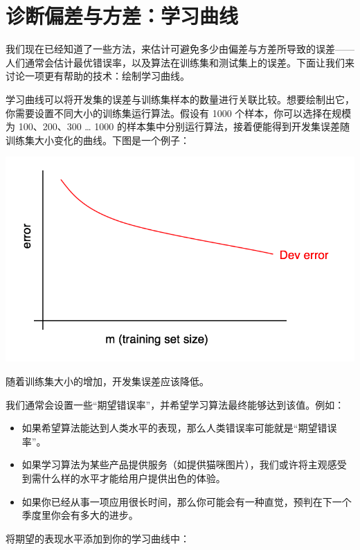 \hypertarget{ux8bcaux65adux504fux5deeux4e0eux65b9ux5deeux5b66ux4e60ux66f2ux7ebf}{%
\chapter{诊断偏差与方差：学习曲线}\label{ux8bcaux65adux504fux5deeux4e0eux65b9ux5deeux5b66ux4e60ux66f2ux7ebf}}

我们现在已经知道了一些方法，来估计可避免多少由偏差与方差所导致的误差------人们通常会估计最优错误率，以及算法在训练集和测试集上的误差。下面让我们来讨论一项更有帮助的技术：绘制学习曲线。

学习曲线可以将开发集的误差与训练集样本的数量进行关联比较。想要绘制出它，你需要设置不同大小的训练集运行算法。假设有
1000 个样本，你可以选择在规模为 100、200、300 \ldots{} 1000
的样本集中分别运行算法，接着便能得到开发集误差随训练集大小变化的曲线。下图是一个例子：

\includegraphics{./img/ch28_01.jpg}

随着训练集大小的增加，开发集误差应该降低。

我们通常会设置一些``期望错误率''，并希望学习算法最终能够达到该值。例如：

\begin{itemize}
\tightlist
\item
  如果希望算法能达到人类水平的表现，那么人类错误率可能就是``期望错误率''。
\item
  如果学习算法为某些产品提供服务（如提供猫咪图片），我们或许将主观感受到需什么样的水平才能给用户提供出色的体验。
\item
  如果你已经从事一项应用很长时间，那么你可能会有一种直觉，预判在下一个季度里你会有多大的进步。
\end{itemize}

将期望的表现水平添加到你的学习曲线中：

